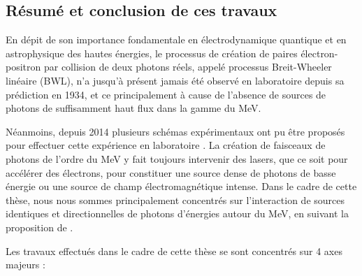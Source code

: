 \begin{refsection}
\section{Résumé et conclusion de ces travaux}

En dépit de son importance fondamentale en électrodynamique quantique et en astrophysique des hautes énergies, le processus de création de paires électron-positron par collision de deux photons réels, appelé processus Breit-Wheeler linéaire (BWL), n'a jusqu'à présent jamais été observé en laboratoire depuis sa prédiction en 1934, et ce principalement à cause de l'absence de sources de photons de suffisamment haut flux dans la gamme du MeV.

Néanmoins, depuis 2014 plusieurs schémas expérimentaux ont pu être proposés pour effectuer cette expérience en laboratoire \parencite{pike_2014, ribeyre_2016, drebot_2017, yu_2019, wang_2020, he_2020, golub_2020}.
La création de faisceaux de photons de l'ordre du MeV y fait toujours intervenir des lasers, que ce soit pour accélérer des électrons, pour constituer une source dense de photons de basse énergie ou une source de champ électromagnétique intense.
Dans le cadre de cette thèse, nous nous sommes principalement concentrés sur l'interaction de sources identiques et directionnelles de photons d'énergies autour du MeV, en suivant la proposition de \cite{ribeyre_2016}. 

Les travaux effectués dans le cadre de cette thèse se sont concentrés sur 4 axes majeurs :


\end{refsection}
